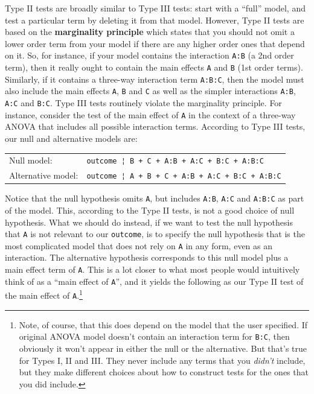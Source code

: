 \documentclass[
]{book}
\theoremstyle{definition}
\theoremstyle{definition}
\theoremstyle{definition}
\theoremstyle{definition}
\theoremstyle{remark}
\begin{document}
Type II tests are broadly similar to Type III tests: start with a ``full'' model, and test a particular term by deleting it from that model. However, Type II tests are based on the \textbf{marginality principle} which states that you should not omit a lower order term from your model if there are any higher order ones that depend on it. So, for instance, if your model contains the interaction \texttt{A:B} (a 2nd order term), then it really ought to contain the main effects \texttt{A} and \texttt{B} (1st order terms). Similarly, if it contains a three-way interaction term \texttt{A:B:C}, then the model must also include the main effects \texttt{A}, \texttt{B} and \texttt{C} as well as the simpler interactions \texttt{A:B}, \texttt{A:C} and \texttt{B:C}. Type III tests routinely violate the marginality principle. For instance, consider the test of the main effect of \texttt{A} in the context of a three-way ANOVA that includes all possible interaction terms. According to Type III tests, our null and alternative models are:

\begin{longtable}[]{@{}ll@{}}
\toprule()
\endhead
Null model: & \texttt{outcome\ ¦\ B\ +\ C\ +\ A:B\ +\ A:C\ +\ B:C\ +\ A:B:C} \\
Alternative model: & \texttt{outcome\ ¦\ A\ +\ B\ +\ C\ +\ A:B\ +\ A:C\ +\ B:C\ +\ A:B:C} \\
\bottomrule()
\end{longtable}

Notice that the null hypothesis omits \texttt{A}, but includes \texttt{A:B}, \texttt{A:C} and \texttt{A:B:C} as part of the model. This, according to the Type II tests, is not a good choice of null hypothesis. What we should do instead, if we want to test the null hypothesis that \texttt{A} is not relevant to our \texttt{outcome}, is to specify the null hypothesis that is the most complicated model that does not rely on \texttt{A} in any form, even as an interaction. The alternative hypothesis corresponds to this null model plus a main effect term of \texttt{A}. This is a lot closer to what most people would intuitively think of as a ``main effect of \texttt{A}'', and it yields the following as our Type II test of the main effect of \texttt{A}.\footnote{Note, of course, that this does depend on the model that the user specified. If original ANOVA model doesn't contain an interaction term for \texttt{B:C}, then obviously it won't appear in either the null or the alternative. But that's true for Types I, II and III. They never include any terms that you \emph{didn't} include, but they make different choices about how to construct tests for the ones that you did include.}
\end{document}
